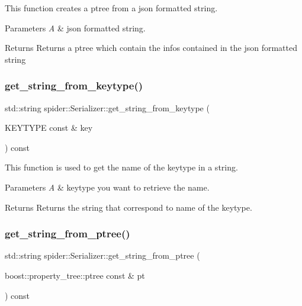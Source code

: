 This function creates a ptree from a json formatted string. 


\begin{DoxyParams}{Parameters}
{\em A} & json formatted string. \\
\hline
\end{DoxyParams}
\begin{DoxyReturn}{Returns}
Returns a ptree which contain the infos contained in the json formatted string 
\end{DoxyReturn}
\mbox{\label{classspider_1_1_serializer_a63becae2837c0f731ee95da9abadcc58}} 
\subsubsection{\texorpdfstring{get\+\_\+string\+\_\+from\+\_\+keytype()}{get\_string\_from\_keytype()}}
{\footnotesize\ttfamily std\+::string spider\+::\+Serializer\+::get\+\_\+string\+\_\+from\+\_\+keytype (\begin{DoxyParamCaption}\item[{K\+E\+Y\+T\+Y\+PE const \&}]{key }\end{DoxyParamCaption}) const}



This function is used to get the name of the keytype in a string. 


\begin{DoxyParams}{Parameters}
{\em A} & keytype you want to retrieve the name. \\
\hline
\end{DoxyParams}
\begin{DoxyReturn}{Returns}
Returns the string that correspond to name of the keytype. 
\end{DoxyReturn}
\mbox{\label{classspider_1_1_serializer_ab7253d1d906ea8cfc5921a06e9a31263}} 
\subsubsection{\texorpdfstring{get\+\_\+string\+\_\+from\+\_\+ptree()}{get\_string\_from\_ptree()}}
{\footnotesize\ttfamily std\+::string spider\+::\+Serializer\+::get\+\_\+string\+\_\+from\+\_\+ptree (\begin{DoxyParamCaption}\item[{boost\+::property\+\_\+tree\+::ptree const \&}]{pt }\end{DoxyParamCaption}) const}



